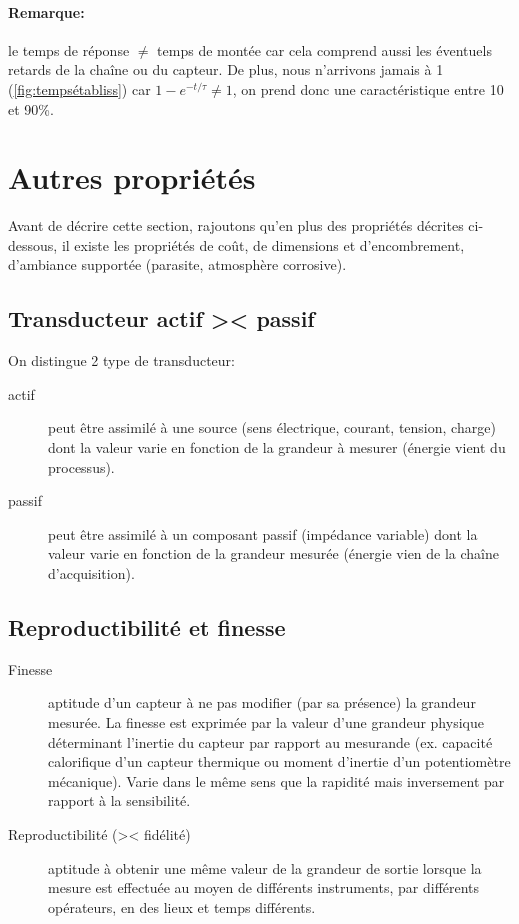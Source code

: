 \paragraph{Remarque:} le temps de réponse \(\neq\) temps de montée car cela comprend aussi les éventuels retards de la chaîne ou du capteur. De plus, nous n'arrivons jamais à 1 (\autoref{fig:tempsétabliss}) car \(1-e^{-t/\tau}\neq 1\), on prend donc une caractéristique entre 10 et 90\%.
\section{Autres propriétés}
Avant de décrire cette section, rajoutons qu'en plus des propriétés décrites ci-dessous, il existe les propriétés de coût, de dimensions et d'encombrement, d'ambiance supportée (parasite, atmosphère corrosive).
\subsection{Transducteur actif >< passif}
On distingue 2 type de transducteur:
\begin{description}
	\item[actif] peut être assimilé à une source (sens électrique, courant, tension, charge) dont la valeur varie en fonction de la grandeur à mesurer (énergie vient du processus).
	\item[passif] peut être assimilé à un composant passif (impédance variable) dont la valeur varie en fonction de la grandeur mesurée (énergie vien de la chaîne d'acquisition).
\end{description}
\subsection{Reproductibilité et finesse}
\begin{description}
	\item[Finesse] aptitude d'un capteur à ne pas modifier (par sa présence) la grandeur mesurée. La finesse est exprimée par la valeur d'une grandeur physique déterminant l'inertie du capteur par rapport au mesurande (ex. capacité calorifique d'un capteur thermique ou moment d'inertie d'un potentiomètre mécanique). Varie dans le même sens que la rapidité mais inversement par rapport à la sensibilité.
	\item[Reproductibilité (>< fidélité)] aptitude à obtenir une même valeur de la grandeur de sortie lorsque la mesure est effectuée au moyen de différents instruments, par différents opérateurs, en des lieux et temps différents.
\end{description}

